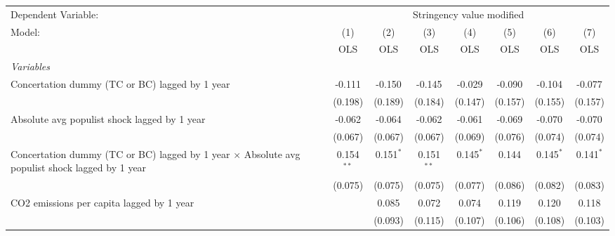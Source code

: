 
\begingroup
\centering
\begin{tabular}{lccccccc}
   \toprule
   Dependent Variable: & \multicolumn{7}{c}{Stringency value modified}\\
   Model:                                                                                                & (1)          & (2)         & (3)          & (4)         & (5)         & (6)         & (7)\\  
                                                                                                         &  OLS         & OLS         & OLS          & OLS         & OLS         & OLS         & OLS\\  
   \midrule
   \emph{Variables}\\
   Concertation dummy (TC or BC) lagged by 1 year                                                        & -0.111       & -0.150      & -0.145       & -0.029      & -0.090      & -0.104      & -0.077\\   
                                                                                                         & (0.198)      & (0.189)     & (0.184)      & (0.147)     & (0.157)     & (0.155)     & (0.157)\\   
   Absolute avg populist shock lagged by 1 year                                                          & -0.062       & -0.064      & -0.062       & -0.061      & -0.069      & -0.070      & -0.070\\   
                                                                                                         & (0.067)      & (0.067)     & (0.067)      & (0.069)     & (0.076)     & (0.074)     & (0.074)\\   
   Concertation dummy (TC or BC) lagged by 1 year $\times$ Absolute avg populist shock lagged by 1 year  & 0.154$^{**}$ & 0.151$^{*}$ & 0.151$^{**}$ & 0.145$^{*}$ & 0.144       & 0.145$^{*}$ & 0.141$^{*}$\\   
                                                                                                         & (0.075)      & (0.075)     & (0.075)      & (0.077)     & (0.086)     & (0.082)     & (0.083)\\   
   CO2 emissions per capita lagged by 1 year                                                             &              & 0.085       & 0.072        & 0.074       & 0.119       & 0.120       & 0.118\\   
                                                                                                         &              & (0.093)     & (0.115)      & (0.107)     & (0.106)     & (0.108)     & (0.103)\\   

\end{tabular}
